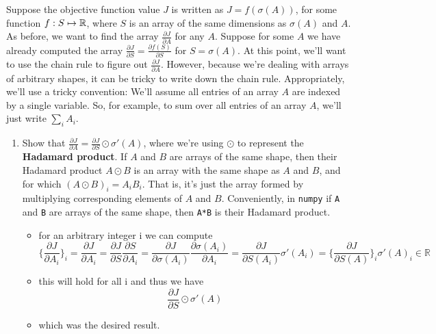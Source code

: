 \documentclass{article}
\theoremstyle{plain}
\theoremstyle{definition}
\begin{document}
Suppose the objective function value $J$ is written as $J=f(\sigma(A))$,
for some function $f:S\mapsto\mathbb{R}$, where $S$ is an array of the
same dimensions as $\sigma(A)$ and $A$. As before, we want to find
the array $\frac{\partial J}{\partial A}$ for any $A$. Suppose for
some $A$ we have already computed the array $\frac{\partial J}{\partial S}=\frac{\partial f(S)}{\partial S}$
for $S=\sigma(A)$. At this point, we'll want to use the chain rule
to figure out $\frac{\partial J}{\partial A}$. However, because we're
dealing with arrays of arbitrary shapes, it can be tricky to write
down the chain rule. Appropriately, we'll use a tricky convention:
We'll assume all entries of an array $A$ are indexed by a single
variable. So, for example, to sum over all entries of an array $A$,
we'll just write $\sum_{i}A_{i}$. 
\begin{enumerate}
\setcounter{enumi}{\value{saveenum}}
\item Show that $\frac{\partial J}{\partial A}=\frac{\partial J}{\partial S}\odot\sigma'(A)$,
where we're using $\odot$ to represent the \textbf{Hadamard product}.
If $A$ and $B$ are arrays of the same shape, then their Hadamard
product $A\odot B$ is an array with the same shape as $A$ and $B$,
and for which $\left(A\odot B\right)_{i}=A_{i}B_{i}$. That is, it's
just the array formed by multiplying corresponding elements of $A$
and $B$. Conveniently, in \texttt{numpy} if \texttt{A} and \texttt{B}
are arrays of the same shape, then \texttt{A{*}B} is their Hadamard
product.

\begin{itemize}
    \color{blue}
    \item for an arbitrary integer i  we can compute 
    $$\{\frac{\partial J}{\partial A_{i}}\}_i=\frac{\partial J}{\partial A_{i}}=\frac{\partial J}{\partial S}\frac{\partial S}{\partial A_{i}}=\frac{\partial J}{\partial \sigma(A_i)}\frac{\partial \sigma(A_i)}{\partial A_{i}}=\frac{\partial J}{\partial S(A_i)}\sigma'(A_i)=\{\frac{\partial J}{\partial S(A)}\}_i\sigma'(A)_i\in \mathbb{R}$$
    \item this will hold for all i and thus we have $$\frac{\partial J}{\partial S}\odot\sigma'(A)$$
    \item which was the desired result. \blacksquare


\end{itemize}



\setcounter{saveenum}{\value{enumi}}
\end{enumerate}
\end{document}
